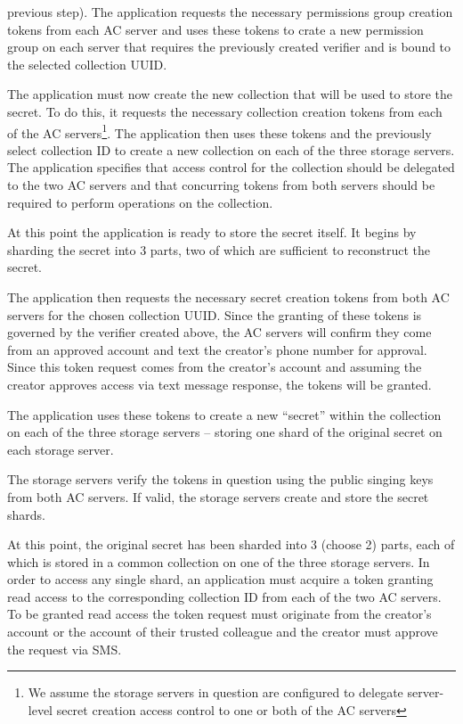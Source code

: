 \begin{packed_enum}
  previous step). The application requests the necessary permissions
  group creation tokens from each AC server and uses these tokens to
  crate a new permission group on each server that requires the
  previously created verifier and is bound to the selected collection
  UUID.
\item The application must now create the new collection that will be
  used to store the secret. To do this, it requests the necessary
  collection creation tokens from each of the AC servers\footnote{We
    assume the storage servers in question are configured to delegate
    server-level secret creation access control to one or both of the
    AC servers}. The application then uses these tokens and the
  previously select collection ID to create a new collection on each
  of the three storage servers. The application specifies that access
  control for the collection should be delegated to the two AC servers
  and that concurring tokens from both servers should be required to
  perform operations on the collection.
\item At this point the application is ready to store the secret
  itself. It begins by sharding the secret into 3 parts, two of which
  are sufficient to reconstruct the secret.
\item The application then requests the necessary secret creation
  tokens from both AC servers for the chosen collection UUID. Since
  the granting of these tokens is governed by the verifier created
  above, the AC servers will confirm they come from an approved
  account and text the creator's phone number for approval. Since this
  token request comes from the creator's account and assuming the
  creator approves access via text message response, the tokens will
  be granted.
\item The application uses these tokens to create a new ``secret''
  within the collection on each of the three storage servers --
  storing one shard of the original secret on each storage server.
\item The storage servers verify the tokens in question using the
  public singing keys from both AC servers. If valid, the storage
  servers create and store the secret shards.
\end{packed_enum}

At this point, the original secret has been sharded into 3 (choose 2)
parts, each of which is stored in a common collection on one of the
three storage servers. In order to access any single shard, an
application must acquire a token granting read access to the
corresponding collection ID from each of the two AC servers. To be
granted read access the token request must originate from the
creator's account or the account of their trusted colleague and the
creator must approve the request via SMS.

